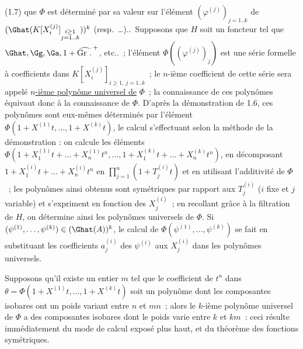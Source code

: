 
(1.7) que \(\Phi\) est
déterminé par sa valeur sur l'élément \((\varphi^{(j)})_{j=1..k}\) de \((\Ghat(K[X_i^{(j)}]_{\substack{i\geq1\\ j=1..k}}))^k\) (resp.\ \ldots)..\ Supposons que \(H\) soit un foncteur tel que \(\Ghat,\Gg,\Ga,1+\widehat{\operatorname{Gr}\,\mathord{.}\,}^{+}\), etc..~; l'élément \(\Phi((\varphi^{(j)})_{j})\) est une série formelle à coefficients dans \(K[X_i^{(j)}]_{i\geq1,\ j=1..k}\)~; le \(n\)-ième coefficient de cette série sera appelé \uline{\(n\)-ième polynôme universel de} \(\Phi\)~; la connaissance de ces polynômes équivaut donc à la connaissance de \(\Phi\). D'après la démonstration de 1.6, ces polynômes sont eux-mêmes déterminés par l'élément \(\Phi(1+X^{(1)}t,\ldots,1+X^{(k)}t)\), le calcul s'effectuant selon la méthode de la démonstration : on calcule les éléments \(\Phi(1+X_1^{(1)}t+\ldots+X_n^{(1)}t^n,\ldots,1+X_1^{(k)}t+\ldots+X_n^{(k)}t^n)\), en décomposant \(1+X_1^{(i)}t+\ldots+X_n^{(i)}t^n\) en \(\prod_{j=1}^{n}(1+T_j^{(i)}t)\) et en utilisant l'additivité de \(\Phi\)~; les polynômes ainsi obtenus sont symétriques par rapport aux \(T_j^{(i)}\) (\(i\) fixe et \(j\) variable) et s'expriment en fonction des \(X_j^{(i)}\)~; en recollant grâce à la filtration de \(H\), on détermine ainsi les polynômes universels de \(\Phi\). Si \((\psi^{(1)},\ldots,\psi^{(k)})\in(\Ghat(A))^k\), le calcul de \(\Phi(\psi^{(1)},\ldots,\psi^{(k)})\) se fait en substituant les coefficients \(a_j^{(i)}\) des \(\psi^{(i)}\) aux \(X_j^{(i)}\) dans les polynômes universels.

Supposons qu'il existe un entier \(m\) tel que le coefficient de \(t^n\) dans \(\theta=\Phi(1+X^{(1)}t,\ldots,1+X^{(k)}t)\) soit un polynôme dont les composantes isobares ont un poids variant entre \(n\) et \(mn\)~; alors le \(k\)-ième polynôme universel de \(\Phi\) a des composantes isobares dont le poids varie entre \(k\) et \(km\)~: ceci résulte immédiatement du mode de calcul exposé plus haut, et du théorème des fonctions symétriques.

